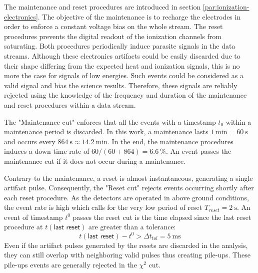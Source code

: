 

The maintenance and reset procedures are introduced in section \ref{par:ionization-electronics}.  The objective of the maintenance is to recharge the electrodes in order to enforce a constant voltage bias on the whole stream. The reset procedures prevents the digital readout of the ionization channels from saturating. Both procedures periodically induce parasite signals in the data streams. Although these electronics artifacts could be easily discarded due to their shape differing from the expected heat and ionization signals, this is no more the case for signals of low energies. Such events could be considered as a valid signal and bias the science results. Therefore, these signals are reliably rejected using the knowledge of the frequency and duration of the maintenance and reset procedures within a data stream.

The "Maintenance cut" enforces that all the events with a timestamp $t_0$ within a maintenance period is discarded. In this work, a maintenance lasts $\SI{1}{\minute}=\SI{60}{\s}$ and occurs every $\SI{864}{\s}\approx\SI{14.2}{\minute}$. In the end, the maintenance procedures induces a down time rate of $60/(60+864)=\SI{6.6}{\percent}$. An event passes the maintenance cut if it does not occur during a maintenance.

Contrary to the maintenance, a reset is almost instantaneous, generating a single artifact pulse. Consequently, the "Reset cut" rejects events occurring shortly after each reset procedure. As the detectors are operated in above ground conditions, the event rate is high which calls for the very low period of reset $T_{reset} = \SI{2}{\s}$. An event of timestamp $t^0$ passes the reset cut is the time elapsed since the last reset procedure at $t(\textsf{last reset})$ are greater than a tolerance:
\begin{equation}
t(\textsf{last reset}) - t^0 > \Delta t_{tol}=\SI{5}{\milli\s}
\end{equation}
Even if the artifact pulses generated by the resets are discarded in the analysis, they can still overlap with neighboring valid pulses thus creating pile-ups. These pile-ups events are generally rejected in the $\chi^2$ cut.


